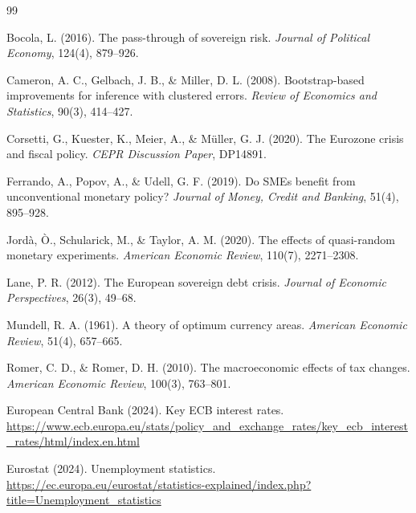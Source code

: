 \documentclass[12pt,a4paper]{article}
\begin{document}
\begin{thebibliography}{99}

 Bocola, L. (2016). The pass-through of sovereign risk. \textit{Journal of Political Economy}, 124(4), 879--926.

 Cameron, A. C., Gelbach, J. B., \& Miller, D. L. (2008). Bootstrap-based improvements for inference with clustered errors. \textit{Review of Economics and Statistics}, 90(3), 414--427.

 Corsetti, G., Kuester, K., Meier, A., \& M\"{u}ller, G. J. (2020). The Eurozone crisis and fiscal policy. \textit{CEPR Discussion Paper}, DP14891.

 Ferrando, A., Popov, A., \& Udell, G. F. (2019). Do SMEs benefit from unconventional monetary policy? \textit{Journal of Money, Credit and Banking}, 51(4), 895--928.

 Jord\`{a}, \`{O}., Schularick, M., \& Taylor, A. M. (2020). The effects of quasi-random monetary experiments. \textit{American Economic Review}, 110(7), 2271--2308.

 Lane, P. R. (2012). The European sovereign debt crisis. \textit{Journal of Economic Perspectives}, 26(3), 49--68.

 Mundell, R. A. (1961). A theory of optimum currency areas. \textit{American Economic Review}, 51(4), 657--665.

 Romer, C. D., \& Romer, D. H. (2010). The macroeconomic effects of tax changes. \textit{American Economic Review}, 100(3), 763--801.

 European Central Bank (2024). Key ECB interest rates. \url{https://www.ecb.europa.eu/stats/policy_and_exchange_rates/key_ecb_interest_rates/html/index.en.html}

 Eurostat (2024). Unemployment statistics. \url{https://ec.europa.eu/eurostat/statistics-explained/index.php?title=Unemployment_statistics}

\end{thebibliography}
\end{document}
